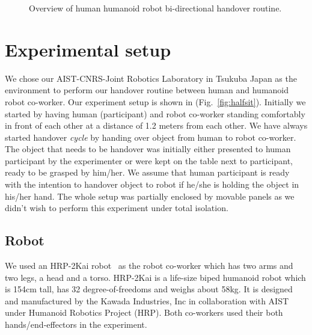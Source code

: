 \begin{figure}[htp]
	
	\caption{Overview of human humanoid robot bi-directional handover routine.}
	\label{fig:handover routine}
\end{figure}


\section{Experimental setup}
We chose our AIST-CNRS-Joint Robotics Laboratory in Tsukuba Japan as the environment to perform our handover routine between human and humanoid robot co-worker. Our experiment setup is shown in (Fig.~\ref{fig:halfsit}). Initially we started by having human (participant) and robot co-worker standing comfortably in front of each other at a distance of 1.2 meters from each other. We have always started handover \textit{cycle} by handing over object from human to robot co-worker. The object that needs to be handover was initially either presented to human participant by the experimenter or were kept on the table next to participant, ready to be grasped by him/her. We assume that human participant is ready with the intention to handover object to robot if he/she is holding the object in his/her hand. The whole setup was partially enclosed by movable panels as we didn't wish to perform this experiment under total isolation.


\subsection{Robot}
We used an HRP-2Kai robot~\cite{Kaneko:RAS_ICHR:2015} as the robot co-worker which has two arms and two legs, a head and a torso. HRP-2Kai is a life-size biped humanoid robot which is 154cm tall, has 32 degree-of-freedoms and weighs about 58kg. It is designed and manufactured by the Kawada Industries, Inc in collaboration with AIST under Humanoid Robotics Project (HRP). Both co-workers used their both hands/end-effectors in the experiment.


